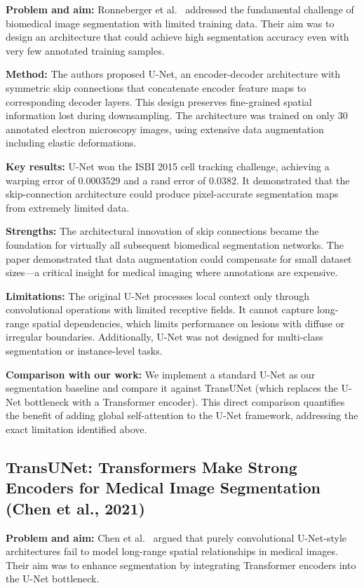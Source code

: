 \documentclass[10pt,twocolumn]{article}
\begin{document}
\textbf{Problem and aim:} Ronneberger et al.\ \cite{Ronneberger2015} addressed the fundamental challenge of biomedical image segmentation with limited training data. Their aim was to design an architecture that could achieve high segmentation accuracy even with very few annotated training samples.

\textbf{Method:} The authors proposed U-Net, an encoder-decoder architecture with symmetric skip connections that concatenate encoder feature maps to corresponding decoder layers. This design preserves fine-grained spatial information lost during downsampling. The architecture was trained on only 30 annotated electron microscopy images, using extensive data augmentation including elastic deformations.

\textbf{Key results:} U-Net won the ISBI 2015 cell tracking challenge, achieving a warping error of 0.0003529 and a rand error of 0.0382. It demonstrated that the skip-connection architecture could produce pixel-accurate segmentation maps from extremely limited data.

\textbf{Strengths:} The architectural innovation of skip connections became the foundation for virtually all subsequent biomedical segmentation networks. The paper demonstrated that data augmentation could compensate for small dataset sizes---a critical insight for medical imaging where annotations are expensive.

\textbf{Limitations:} The original U-Net processes local context only through convolutional operations with limited receptive fields. It cannot capture long-range spatial dependencies, which limits performance on lesions with diffuse or irregular boundaries. Additionally, U-Net was not designed for multi-class segmentation or instance-level tasks.

\textbf{Comparison with our work:} We implement a standard U-Net as our segmentation baseline and compare it against TransUNet (which replaces the U-Net bottleneck with a Transformer encoder). This direct comparison quantifies the benefit of adding global self-attention to the U-Net framework, addressing the exact limitation identified above.

\subsection{TransUNet: Transformers Make Strong Encoders for Medical Image Segmentation (Chen et al., 2021)}

\textbf{Problem and aim:} Chen et al.\ \cite{ChenTransUNet2021} argued that purely convolutional U-Net-style architectures fail to model long-range spatial relationships in medical images. Their aim was to enhance segmentation by integrating Transformer encoders into the U-Net bottleneck.
\end{document}
